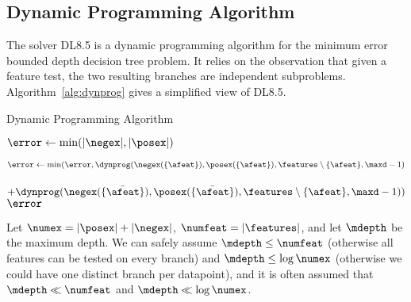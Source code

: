 \documentclass{article}
\begin{document}
\subsection{Dynamic Programming Algorithm}

The solver DL8.5 is a dynamic programming algorithm for the minimum error bounded depth decision tree problem. It relies on the observation that given a feature test, the two resulting branches are independent subproblems. Algorithm~\ref{alg:dynprog} gives a simplified view of DL8.5.


	
	\begin{algorithm}
		\begin{footnotesize}
		\caption{Dynamic Programming Algorithm\label{alg:dynprog}}
		\TitleOfAlgo{\dynprog}
		  \KwData{$\negex,\posex,\features,\maxd$}
			$\error \gets \min(|\negex|,|\posex|)$\;
			
			 {
			\ForEach{$\afeat \in \features$} {
					$\error \gets \min(\error, \dynprog(\negex(\{\afeat\}),\posex(\{\afeat\}),\features \setminus \{\afeat\},\maxd-1)$\;
					\ \ \ \ \ \ \ \ \ \ \ \ \ \ \ \ \ \ \ \ \ \ \ \ \ \ \ \ \ \ \ \ \  $ + \dynprog(\negex(\{\bar{\afeat}\}),\posex(\{\bar{\afeat}\}),\features \setminus \{\afeat\},\maxd-1))$\;
			}
			}
			\Return $\error$\;
			\end{footnotesize}
	\end{algorithm}
	
	
	
	
	Let $\numex = |\posex| + |\negex|$, $\numfeat = |\features|$, and let $\mdepth$ be the maximum depth.
	We can safely assume $\mdepth \leq \numfeat$ (otherwise all features can be tested on every branch) and $\mdepth \leq \log \numex$ (otherwise we could have one distinct branch per datapoint), and it is often assumed that
	 $\mdepth \ll \numfeat$ and $\mdepth \ll \log \numex$. 
	 
\end{document}
